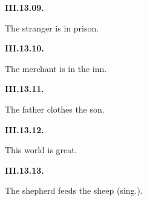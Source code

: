 \par\begin{minipage}{\linewidth}\raggedright
\textbf{III.13.09.}

The stranger is in prison.

\end{minipage}\par\addvspace{4pt}

\par\begin{minipage}{\linewidth}\raggedright
\textbf{III.13.10.}

The merchant is in the inn.

\end{minipage}\par\addvspace{4pt}

\par\begin{minipage}{\linewidth}\raggedright
\textbf{III.13.11.}

The father clothes the son.

\end{minipage}\par\addvspace{4pt}

\par\begin{minipage}{\linewidth}\raggedright
\textbf{III.13.12.}

This world is great.

\end{minipage}\par\addvspace{4pt}

\par\begin{minipage}{\linewidth}\raggedright
\textbf{III.13.13.}

The shepherd feeds the sheep (sing.).

\end{minipage}\par\addvspace{4pt}

